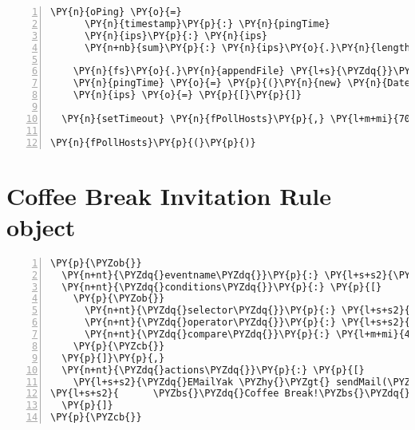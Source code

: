 \begin{Verbatim}[fontsize=\scriptsize,commandchars=\\\{\},numbers=left,firstnumber=1,stepnumber=1]
    \PY{n}{oPing} \PY{o}{=} 
      \PY{n}{timestamp}\PY{p}{:} \PY{n}{pingTime}
      \PY{n}{ips}\PY{p}{:} \PY{n}{ips}
      \PY{n+nb}{sum}\PY{p}{:} \PY{n}{ips}\PY{o}{.}\PY{n}{length}

    \PY{n}{fs}\PY{o}{.}\PY{n}{appendFile} \PY{l+s}{\PYZdq{}}\PY{l+s}{histoappend.json}\PY{l+s}{\PYZdq{}}\PY{p}{,} \PY{n}{JSON}\PY{o}{.}\PY{n}{stringify}\PY{p}{(} \PY{n}{oPing} \PY{p}{)} \PY{o}{+} \PY{l+s}{\PYZdq{}}\PY{l+s+se}{\PYZbs{}n}\PY{l+s}{\PYZdq{}}\PY{p}{,} \PY{l+s}{\PYZdq{}}\PY{l+s}{utf8}\PY{l+s}{\PYZdq{}}
    \PY{n}{pingTime} \PY{o}{=} \PY{p}{(}\PY{n}{new} \PY{n}{Date}\PY{p}{(}\PY{p}{)}\PY{p}{)}\PY{o}{.}\PY{n}{toISOString}\PY{p}{(}\PY{p}{)}
    \PY{n}{ips} \PY{o}{=} \PY{p}{[}\PY{p}{]}

  \PY{n}{setTimeout} \PY{n}{fPollHosts}\PY{p}{,} \PY{l+m+mi}{7000}

\PY{n}{fPollHosts}\PY{p}{(}\PY{p}{)}
\end{Verbatim}






\clearpage
\section{Coffee Break Invitation Rule object \label{ruleCoffeeBreak}}

\begin{Verbatim}[samepage=true,frame=single,fontsize=\footnotesize,commandchars=\\\{\},numbers=left,firstnumber=1,stepnumber=1,xleftmargin
=.3in]
\PY{p}{\PYZob{}}
  \PY{n+nt}{\PYZdq{}eventname\PYZdq{}}\PY{p}{:} \PY{l+s+s2}{\PYZdq{}uptimestatistics\PYZdq{}}\PY{p}{,}
  \PY{n+nt}{\PYZdq{}conditions\PYZdq{}}\PY{p}{:} \PY{p}{[}
    \PY{p}{\PYZob{}}
      \PY{n+nt}{\PYZdq{}selector\PYZdq{}}\PY{p}{:} \PY{l+s+s2}{\PYZdq{}.currentlyon\PYZdq{}}\PY{p}{,}
      \PY{n+nt}{\PYZdq{}operator\PYZdq{}}\PY{p}{:} \PY{l+s+s2}{\PYZdq{}\PYZgt{}\PYZdq{}}\PY{p}{,}
      \PY{n+nt}{\PYZdq{}compare\PYZdq{}}\PY{p}{:} \PY{l+m+mi}{42}
    \PY{p}{\PYZcb{}}
  \PY{p}{]}\PY{p}{,}
  \PY{n+nt}{\PYZdq{}actions\PYZdq{}}\PY{p}{:} \PY{p}{[}
    \PY{l+s+s2}{\PYZdq{}EMailYak \PYZhy{}\PYZgt{} sendMail(\PYZbs{}\PYZdq{}eca\PYZhy{}engine@mscliveweb.simpleyak.com\PYZbs{}\PYZdq{},[usermaillist],}
\PY{l+s+s2}{      \PYZbs{}\PYZdq{}Coffee Break!\PYZbs{}\PYZdq{},\PYZbs{}\PYZdq{}Let\PYZsq{}s go for a coffee at 10!\PYZbs{}\PYZdq{})\PYZdq{}}
  \PY{p}{]}
\PY{p}{\PYZcb{}}
\end{Verbatim}




